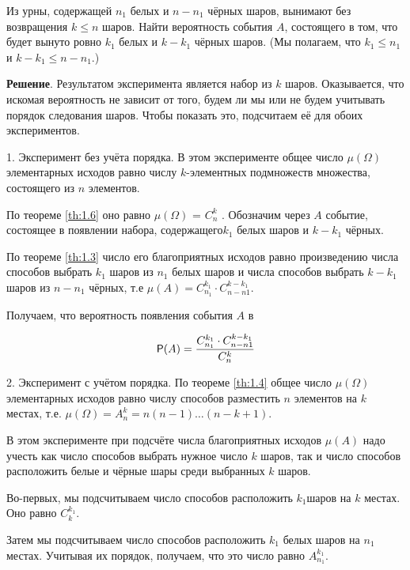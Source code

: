 \begin{num}
\label{num:10.1}
Из урны, содержащей $n_1$ белых и $n - n_1$ чёрных шаров,
вынимают без возвращения $k \leq n$ шаров. Найти вероятность события $A$, состоящего в том, что будет вынуто ровно $k_1$ белых и $k-k_1$ чёрных шаров.
(Мы полагаем, что $k_1 \leq n_1$ и $k - k_1 \leq n - n_1$.)
\end{num}

\textbf{Решение}. Результатом эксперимента является набор из $k$ шаров. Оказывается, что искомая вероятность не зависит от того, будем ли мы или не будем учитывать порядок следования шаров. Чтобы показать это, подсчитаем её для обоих экспериментов.

1. Эксперимент без учёта порядка. В этом эксперименте общее число $\mu(\Omega)$ элементарных исходов равно числу $k$-элементных подмножеств множества, состоящего из $n$ элементов.

По теореме \ref{th:1.6} оно равно $\mu(\Omega)$ = $C_n^k$ .
Обозначим через $A$ событие, состоящее в появлении набора, содержащего$ k_1$ белых шаров и $k - k_1$ чёрных. 

По теореме \ref{th:1.3} число его благоприятных исходов равно произведению числа способов выбрать $k_1$ шаров из $n_1$ белых шаров и числа способов выбрать $k - k_1$ шаров из $n - n_1$ чёрных, т.е $\mu(A) = C_{n_1}^{k_1}\cdot C_{n-n1}^{k-k_1}$.

Получаем, что вероятность появления события $A$ в

\begin{equation*}
	\P(A)=\frac{C_{n_1}^{k_1}\cdot C_{n-n1}^{k-k_1}}{C_n^k}
\end{equation*}

2. Эксперимент с учётом порядка. По теореме \ref{th:1.4} общее число $\mu(\Omega)$ элементарных исходов равно числу способов разместить $n$ элементов на $k$
местах, т.е. $\mu(\Omega) = A_n^k = n(n - 1)\ldots(n - k + 1)$.

В этом эксперименте при подсчёте числа благоприятных исходов $\mu(A)$ надо учесть как число способов выбрать нужное число $k$ шаров, так и число способов расположить белые и чёрные шары среди выбранных $k$ шаров.

Во-первых, мы подсчитываем число способов расположить $k_1$шаров на $k$
местах. Оно равно $C_k^{k_1}$. 

Затем мы подсчитываем число способов расположить $k_1$ белых шаров на $n_1$ местах. Учитывая их порядок, получаем, что
это число равно $A_{n_1}^{k_1}$. 

